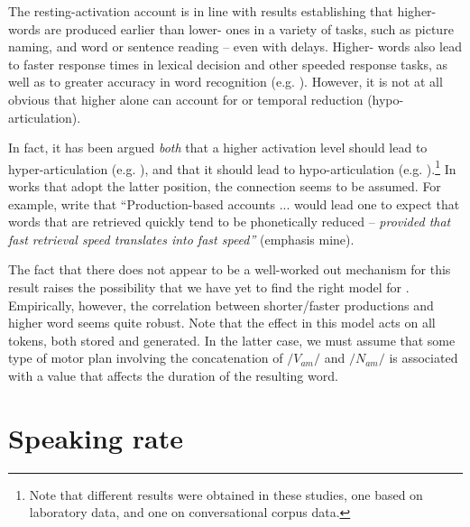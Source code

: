 The resting-activation account is in line with results establishing
that higher- words are produced earlier than lower-
ones in a variety of tasks, such as picture naming, and word or sentence
reading – even with delays. Higher- words also lead to faster
response times in lexical decision and other speeded response tasks,
as well as to greater accuracy in word recognition (e.g. \citealt{howes1951visual,balota1985locus,Luce1986,Marslen-Wilson1990}).
However, it is not at all obvious that higher  alone
can account for  or temporal reduction (hypo-articulation).

In fact, it has been argued \emph{both} that a higher activation level
should lead to hyper-articulation (e.g. \citealt{Baese-Berk2009}),
and that it should lead to hypo-articulation (e.g. \citealt{gahl2012reduce}).\footnote{Note that different results were obtained in these studies, one based
on laboratory data, and one on conversational corpus data.} In works that adopt the latter position, the connection seems to
be assumed. For example, \citet[79]{gahl2012reduce}
write that “Production-based accounts ... would lead one to expect
that words that are retrieved quickly tend to be phonetically reduced
– \emph{provided that fast retrieval speed translates into fast 
speed”} (emphasis mine).

The fact that there does not appear to be a well-worked out mechanism
for this result raises the possibility that we have yet to find the
right model for . Empirically, however, the correlation between
shorter/faster productions and higher word  seems quite robust. Note that the
 effect in this model acts on all tokens, both stored and
generated. In the latter case, we must assume that some type of motor
plan involving the concatenation of $/V_{am}/$ and $/N_{am}/$ is
associated with a  value that affects the duration
of the resulting word. 

\section{Speaking rate}

